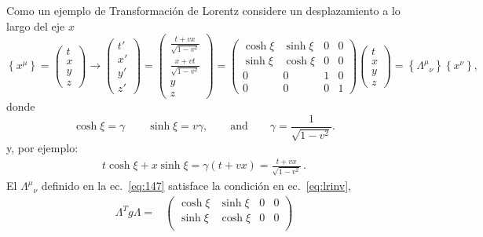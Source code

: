 \begin{frame}


Como un ejemplo de Transformaci\'on de Lorentz considere un desplazamiento a lo largo del eje $x$
\begin{equation}
\label{eq:147}
  \left\{x^\mu\right\}=\begin{pmatrix}
    t\\
    x\\
    y\\
    z
  \end{pmatrix}\to
  \begin{pmatrix}
    t'\\
    x'\\
    y'\\
    z'
  \end{pmatrix}=
  \begin{pmatrix}
    \frac{t+vx}{\sqrt{1-v^2}}\\
    \frac{x+vt}{\sqrt{1-v^2}}\\
    y\\
    z
  \end{pmatrix}=
  \begin{pmatrix}
    \cosh\xi&\sinh\xi&0&0\\
    \sinh\xi&\cosh\xi&0&0\\
    0     &  0  &1&0\\
    0     &  0  &0&1
  \end{pmatrix}
  \begin{pmatrix}
    t\\
    x\\
    y\\
    z
  \end{pmatrix}=\left\{{\Lambda^\mu}_{\nu}\right\}\left\{x^\nu\right\},
\end{equation}
donde
\begin{equation}
  \cosh\xi=\gamma\qquad\sinh\xi=v\gamma,\qquad\text{and}\qquad \gamma=\frac{1}{\sqrt{1-v^2}}.
\end{equation}
y, por ejemplo:
\begin{align}
  t\cosh{\xi}+x\sinh\xi=\gamma(t+v x)=\frac{t+v x}{\sqrt{1-v^2}}\,.
\end{align}
El ${\Lambda^\mu}_{\nu}$ definido en la ec.~\eqref{eq:147} satisface la condici\'on en ec.~\eqref{eq:lrinv}, 
\begin{align}
  \Lambda^T g \Lambda=&\begin{pmatrix}
    \cosh\xi&\sinh\xi&0&0\\
    \sinh\xi&\cosh\xi&0&0\\

\end{pmatrix}
\end{align}
\end{frame}
